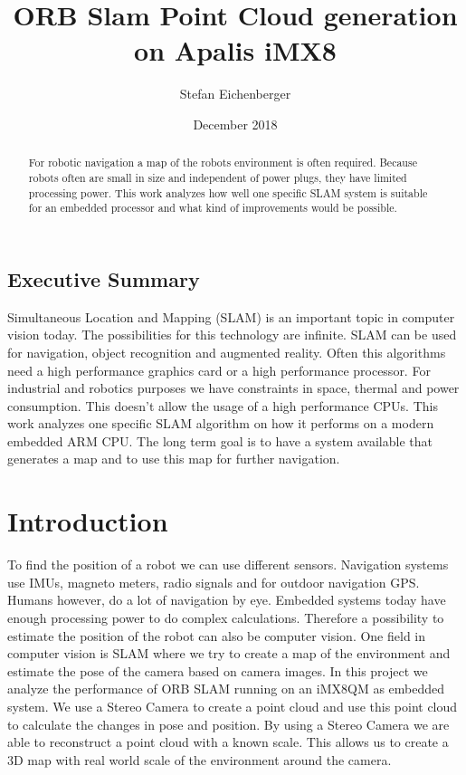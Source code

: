 \documentclass[11pt,a4paper,titlepage,oneside]{report}
\title{ORB Slam Point Cloud generation on Apalis iMX8}
\author{Stefan Eichenberger}
\date{December 2018}
\begin{document}
\maketitle

\begin{abstract}
	For robotic navigation a map of the robots environment is often required. Because robots often are small in size and independent of power plugs, they have limited processing power. This work analyzes how well one specific SLAM system is suitable for an embedded processor and what kind of improvements would be possible.
\end{abstract}

\section*{Executive Summary}
Simultaneous Location and Mapping (SLAM) is an important topic in computer vision today. The possibilities for this technology are infinite. SLAM can be used for navigation, object recognition and augmented reality. Often this algorithms need a high performance graphics card or a high performance processor. For industrial and robotics purposes we have constraints in space, thermal and power consumption. This doesn't allow the usage of a high performance CPUs. This work analyzes one specific SLAM algorithm on how it performs on a modern embedded ARM CPU. The long term goal is to have a system available that generates a map and to use this map for further navigation.

\tableofcontents

\chapter{Introduction}
To find the position of a robot we can use different sensors. Navigation systems use IMUs, magneto meters, radio signals and for outdoor navigation GPS. Humans however, do a lot of navigation by eye. Embedded systems today have enough processing power to do complex calculations. Therefore a possibility to estimate the position of the robot can also be computer vision. One field in computer vision is SLAM where we try to create a map of the environment and estimate the pose of the camera based on camera images. In this project we analyze the performance of ORB SLAM \cite{orbslam} running on an iMX8QM as embedded system. We use a Stereo Camera to create a point cloud and use this point cloud to calculate the changes in pose and position. By using a Stereo Camera we are able to reconstruct a point cloud with a known scale. This allows us to create a 3D map with real world scale of the environment around the camera.
\end{document}

